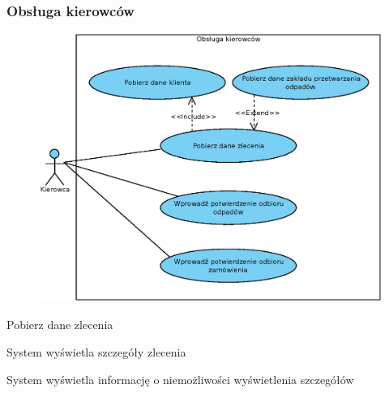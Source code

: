 \subsubsection{Obsługa kierowców}

	\begin{figure}[H]
		\centering
		\includegraphics[width=.8\textwidth]{img/UC/kierowcy.eps}
	\end{figure}

	\begin{usecase}{Pobierz dane zlecenia}
		\author{Dawid Suder}
		\maketitle
		\begin{scenario}
			\begin{enumerate}
				 System wyświetla szczegóły zlecenia
			\end{enumerate}
		\end{scenario}
		\begin{extensions}
			\begin{enumerate}
			 System wyświetla informację o niemożliwości wyświetlenia szczegółów
			\end{enumerate}
		\end{extensions}
\end{usecase}

